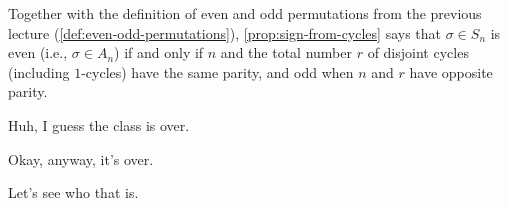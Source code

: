 \begin{aiNote}
Together with the definition of even and odd permutations from the previous lecture (\cref{def:even-odd-permutations}), \cref{prop:sign-from-cycles} says that $\sigma \in S_n$ is even (i.e., $\sigma \in A_n$) if and only if $n$ and the total number $r$ of disjoint cycles (including $1$-cycles) have the same parity, and odd when $n$ and $r$ have opposite parity.
\end{aiNote}

\begin{speech}[00:42:08 - 00:42:21]
 Huh, I guess the class is over.

Okay, anyway, it's over.

Let's see who that is.
\end{speech}

